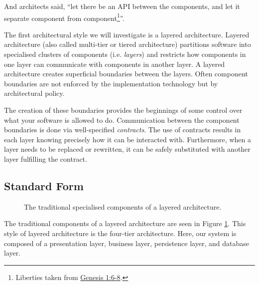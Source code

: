 And architects said, ``let there be an API between the components,
and let it separate component from component\footnote{Liberties taken from
\href{https://www.biblegateway.com/passage/?search=gen+1\&version=ESV}{Genesis 1:6-8}.}''.

The first architectural style we will investigate is a layered architecture.
Layered architecture (also called multi-tier or tiered architecture) 
partitions software into specialised clusters of components (i.e. \emph{layers})
and restricts how components in one layer can communicate with components in another layer.
A layered architecture creates superficial boundaries between the layers.
Often component boundaries are not enforced by the implementation technology but by architectural policy.

The creation of these boundaries provides the beginnings of some control over what your software is allowed to do.
Communication between the component boundaries is done via well-specified \emph{contracts}.
The use of contracts results in each layer knowing precisely how it can be interacted with.
Furthermore, when a layer needs to be replaced or rewritten, it can be safely substituted with another layer fulfilling the contract.


\subsection{Standard Form}

\begin{figure}[ht]
\centering
{}
\caption{The traditional specialised components of a layered architecture.}
\label{fig:traditional-layered}
\end{figure}

The traditional components of a layered architecture are seen in Figure \ref{fig:traditional-layered}.
This style of layered architecture is the four-tier architecture.
Here, our system is composed of a presentation layer, business layer, persistence layer, and database layer.

